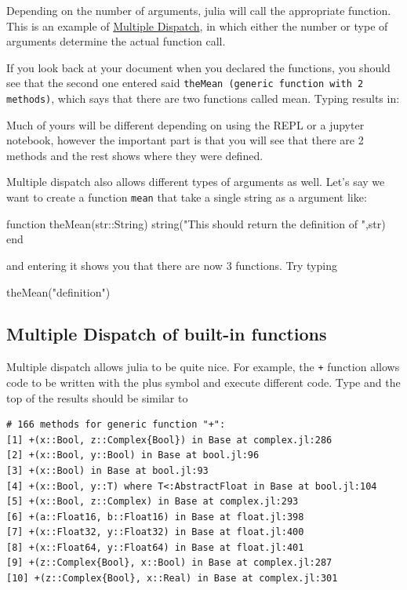Depending on the number of arguments, julia will call the appropriate function. This is an example of
\href{https://en.wikipedia.org/wiki/Multiple_dispatch}{Multiple Dispatch}, in which either the number or type of arguments determine the actual function call.

If you look back at your document when you declared the functions, you should see that the second one entered said \verb!theMean (generic function with 2 methods)!, which says that there are two functions called mean. Typing  results in:  \printpythontex[verbatim]

Much of yours will be different depending on using the REPL or a jupyter notebook, however the important part is that you will see that there are 2 methods and the rest shows where they were defined.  

Multiple dispatch also allows different types of arguments as well. Let's say we want to create a function \texttt{mean} that take a single string as a argument like:

\begin{jlblock}[functions]
function theMean(str::String)
  string("This should return the definition of ",str)
end
\end{jlblock}
%
and entering it shows you that there are now 3 functions. Try typing
\begin{jlblock}[functions]
theMean("definition")
\end{jlblock}

\subsection{Multiple Dispatch of built-in functions}

Multiple dispatch allows julia to be quite nice.  For example, the \texttt{+} function allows code to be written with the plus symbol and execute different code.  Type  and the top of the results should be similar to 
\begin{Verbatim}
# 166 methods for generic function "+":
[1] +(x::Bool, z::Complex{Bool}) in Base at complex.jl:286
[2] +(x::Bool, y::Bool) in Base at bool.jl:96
[3] +(x::Bool) in Base at bool.jl:93
[4] +(x::Bool, y::T) where T<:AbstractFloat in Base at bool.jl:104
[5] +(x::Bool, z::Complex) in Base at complex.jl:293
[6] +(a::Float16, b::Float16) in Base at float.jl:398
[7] +(x::Float32, y::Float32) in Base at float.jl:400
[8] +(x::Float64, y::Float64) in Base at float.jl:401
[9] +(z::Complex{Bool}, x::Bool) in Base at complex.jl:287
[10] +(z::Complex{Bool}, x::Real) in Base at complex.jl:301
\end{Verbatim}


